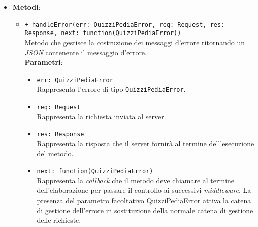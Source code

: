 \begin{itemize}
\begin{itemize}
	\end{itemize}
	\item \textbf{Metodi}:\\
	\begin{itemize}
		\item \texttt{+ handleError(err: QuizziPediaError, req: Request, res: Response, next: function(QuizziPediaError))}\\
		Metodo che gestisce la costruzione dei messaggi d'errore ritornando un \textit{JSON} contenente il messaggio d'errore.\\
		\textbf{Parametri}:
		\begin{itemize}
			\item \texttt{err: QuizziPediaError}\\
			Rappresenta l'errore di tipo \texttt{QuizziPediaError}.
			\item \texttt{req: Request}\\
			Rappresenta la richiesta inviata al server.
			\item \texttt{res: Response}\\
			Rappresenta la risposta che il server fornirà al termine dell'esecuzione del metodo.
			\item \texttt{next: function(QuizziPediaError)}\\
			Rappresenta la \textit{callback} che il metodo deve chiamare al termine dell'elaborazione per passare il controllo ai successivi \textit{middleware}. La presenza del parametro facoltativo QuizziPediaError attiva la catena di gestione dell'errore in sostituzione della normale catena di gestione delle richieste.
		\end{itemize}
	\end{itemize}
\end{itemize}
